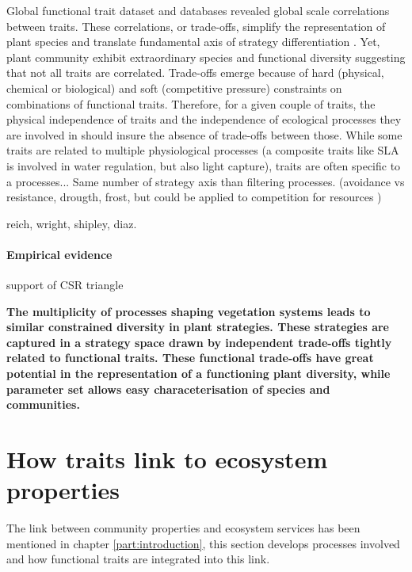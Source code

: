 Global functional trait dataset and databases revealed global scale correlations between traits. These correlations, or trade-offs, simplify the representation of plant species \parencite{diaz_global_2016} and translate fundamental axis of strategy differentiation \parencite{reich_world-wilde_2013}. Yet, plant community exhibit extraordinary species and functional diversity suggesting that not all traits are correlated. Trade-offs emerge because of hard (physical, chemical or biological) and soft (competitive pressure) constraints on combinations of functional traits. Therefore, for a given couple of traits, the physical independence of traits and the independence of ecological processes they are involved in should insure the absence of trade-offs between those. While some traits are related to multiple physiological processes (a composite traits like SLA is involved in water regulation, but also light capture), traits are often specific to a processes...
Same number of strategy axis than filtering processes. (avoidance vs resistance, drougth, frost, but could be applied to competition for resources )


reich, wright, shipley, diaz.

\paragraph{Empirical evidence}

support of CSR triangle \cite{frenette-dussault_functional_2012, pierce_allocating_2013}

\textbf{The multiplicity of processes shaping vegetation systems leads to similar constrained diversity in plant strategies. These strategies are captured in a strategy space drawn by independent trade-offs tightly related to functional traits. These functional trade-offs have great potential in the representation of a functioning plant diversity, while parameter set allows easy characeterisation of species and communities.}



\section{How traits link to ecosystem properties}

The link between community properties and ecosystem services has been mentioned in chapter \ref{part:introduction}, this section develops processes involved and how functional traits are integrated into this link.

